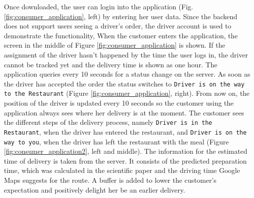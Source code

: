 Once downloaded, the user can login into the application (Fig. \ref{fig:consumer_application}, left) by entering her user data. Since the backend does not support users seeing a driver's order, the driver account is used to demonstrate the functionality, \newline
When the customer enters the application, the screen in the middle of Figure \ref{fig:consumer_application} is shown. If the assignment of the driver hasn't happened by the time the user logs in, the driver cannot be tracked yet and the delivery time is shown as one hour.\newline
The application queries every 10 seconds for a status change on the server. As soon as the driver has accepted the order the status switches to \texttt{Driver is on the way to the Restaurant} (Figure \ref{fig:consumer_application}, right). From now on, the position of the driver is updated every 10 seconds so the customer using the application always sees where her delivery is at the moment. The customer sees the different steps of the delivery process, namely \texttt{Driver is in the Restaurant}, when the driver has entered the restaurant, and \texttt{Driver is on the way to you}, when the driver has left the restaurant with the meal (Figure \ref{fig:consumer_application2}, left and middle). The information for the estimated time of delivery is taken from the server. It consists of the predicted preparation time, which was calculated in the scientific paper and the driving time Google Maps suggests for the route. A buffer is added to lower the customer's expectation and positively delight her be an earlier delivery.


